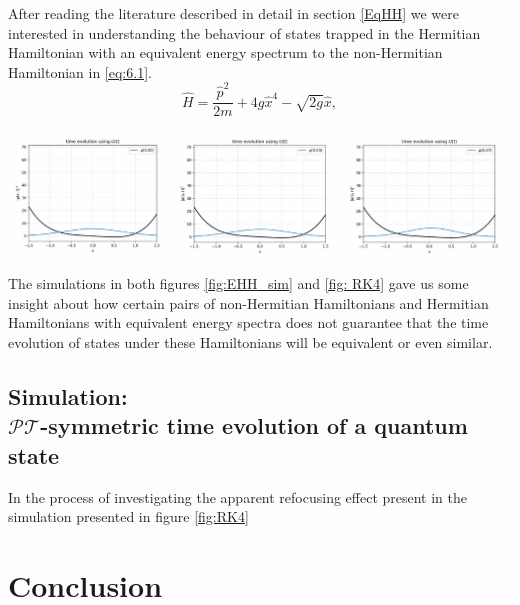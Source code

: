 \documentclass[12pt, a4paper]{report}
\newenvironment{Figure}
    {\par\medskip\noindent\minipage{\linewidth}}
    {\endminipage\par\medskip}
\newcommand\PT{\(\mathcal{PT}\)}
\begin{document}
After reading the literature described in detail in section \ref{EqHH} we were interested in understanding the behaviour of states trapped in the Hermitian Hamiltonian with an equivalent energy spectrum to the non-Hermitian Hamiltonian in \ref{eq:6.1}\cite{HHEquivalent, Equivalent_withanomaly, ParityAnomaly}. 
\begin{equation}\label{eq:6.3}
\hat{H} = \frac{\hat{p}^2}{2m} + 4g\hat{x}^4 - \sqrt{2g}\hat{x},
\end{equation}
\begin{Figure}
\centering
\includegraphics[width=\linewidth]{EHH_sim.pdf}
\label{fig:EHH_sim}
\end{Figure}
The simulations in both figures \ref{fig:EHH_sim} and \ref{fig: RK4} gave us some insight about how certain pairs of non-Hermitian Hamiltonians and Hermitian Hamiltonians with equivalent energy spectra does not guarantee that the time evolution of states under these Hamiltonians will be equivalent or even similar.

\section{Simulation:\\ \PT-symmetric time evolution of a quantum state}
In the process of investigating the apparent refocusing effect present in the simulation presented in figure \ref{fig:RK4} 


\chapter{Conclusion}\label{Conclusion}



\end{document}
